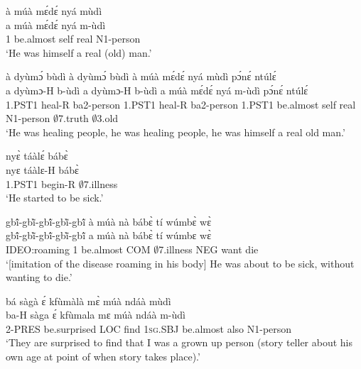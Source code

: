 \begin{exe} 
\exA\label{05a}
  \glll  à múà mɛ́dɛ́ nyá mùdì \\
          a múà mɛ́dɛ́ nyá m-ùdì   \\
         1 be.almost self real N1-person    \\
    \trans `He was himself a real (old) man.'
\end{exe}

\begin{exe} 
\exA\label{06} 
  \glll  à dyùmɔ́ bùdì à dyùmɔ́ bùdì à múà mɛ́dɛ́ nyá mùdì pɔ́nɛ́ ntúlɛ́    \\
           a dyùmɔ-H b-ùdì a dyùmɔ-H b-ùdì a múà    mɛ́dɛ́ nyá m-ùdì pɔ́nɛ́ ntúlɛ́  \\
           1.PST1 heal-R ba2-person 1.PST1 heal-R ba2-person 1.PST1 be.almost self real N1-person $\emptyset$7.truth $\emptyset$3.old \\
    \trans `He was healing people, he was healing people, he was himself a real old man.'
\end{exe}

\begin{exe} 
\exA\label{07}
  \glll  nyɛ̀ táàlɛ́ bábɛ̀    \\
          nyɛ táàlɛ-H bábɛ̀  \\
          1.PST1 begin-R $\emptyset$7.illness       \\
    \trans `He started to be sick.'
\end{exe}

\begin{exe} 
\exA\label{08} 
  \glll  gbĩ́-gbĩ̀-gbĩ́-gbĩ̀-gbĩ́  à múà nà bábɛ̀ tí wúmbɛ̀ wɛ̀\\
            gbĩ́-gbĩ̀-gbĩ́-gbĩ̀-gbĩ́  a múà nà bábɛ̀ tí wúmbɛ wɛ̀\\
         IDEO:roaming 1 be.almost COM $\emptyset$7.illness NEG want die\\
    \trans `[imitation of the disease roaming in his body] He was about to be sick, without wanting to die.'
\end{exe}

\begin{exe} 
\exA\label{09}
  \glll   bá sàgà ɛ́ kfùmàlà mɛ̀ múà ndáà mùdì   \\
         ba-H sàga ɛ́ kfùmala mɛ múà ndáà m-ùdì\\
         2-PRES be.surprised LOC find 1\textsc{sg}.SBJ be.almost also N1-person\\
    \trans `They are surprised to find that I was a grown up person (story teller about his own age at point of when story takes place).'
\end{exe}

